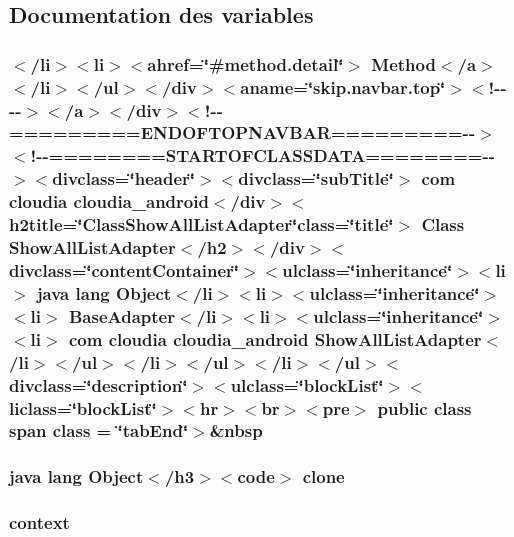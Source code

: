 \subsection{Documentation des variables}
\hypertarget{_show_all_list_adapter_8html_afe28951bafe2fbb9ad941f5c294b0a9b}{
\subsubsection[{class}]{\setlength{\rightskip}{0pt plus 5cm}$<$/li$>$$<$li$>$$<$ahref=\char`\"{}\#method.\-detail\char`\"{}$>$ Method$<$/{\bf a}$>$$<$/li$>$$<$/ul$>$$<$/div$>$$<$aname=\char`\"{}skip.\-navbar.\-top\char`\"{}$>$$<$!-\/-\/-\/-\/$>$$<$/a$>$$<$/div$>$$<$!-\/-\/=========E\-N\-D\-O\-F\-T\-O\-P\-N\-A\-V\-B\-A\-R=========-\/-\/$>$$<$!-\/-\/========S\-T\-A\-R\-T\-O\-F\-C\-L\-A\-S\-S\-D\-A\-T\-A========-\/-\/$>$$<$divclass=\char`\"{}header\char`\"{}$>$$<$divclass=\char`\"{}sub\-Title\char`\"{}$>$ com cloudia cloudia\-\_\-android$<$/div$>$$<$h2title=\char`\"{}Class\-Show\-All\-List\-Adapter\char`\"{}class=\char`\"{}title\char`\"{}$>$ Class {\bf Show\-All\-List\-Adapter}$<$/h2$>$$<$/div$>$$<$divclass=\char`\"{}content\-Container\char`\"{}$>$$<$ulclass=\char`\"{}inheritance\char`\"{}$>$$<$li$>$ java lang Object$<$/li$>$$<$li$>$$<$ulclass=\char`\"{}inheritance\char`\"{}$>$$<$li$>$ Base\-Adapter$<$/li$>$$<$li$>$$<$ulclass=\char`\"{}inheritance\char`\"{}$>$$<$li$>$ com cloudia cloudia\-\_\-android {\bf Show\-All\-List\-Adapter}$<$/li$>$$<$/ul$>$$<$/li$>$$<$/ul$>$$<$/li$>$$<$/ul$>$$<$divclass=\char`\"{}description\char`\"{}$>$$<$ulclass=\char`\"{}block\-List\char`\"{}$>$$<$liclass=\char`\"{}block\-List\char`\"{}$>$$<$hr$>$$<$br$>$$<$pre$>$ public class {\bf span} class = \char`\"{}tab\-End\char`\"{}$>$\&nbsp}}\label{_show_all_list_adapter_8html_afe28951bafe2fbb9ad941f5c294b0a9b}
\hypertarget{_show_all_list_adapter_8html_adc9607fcabf6f2d7f401ad52015ef6e0}{
\subsubsection[{clone}]{\setlength{\rightskip}{0pt plus 5cm}java lang Object$<$/h3$>$$<$code$>$ clone}}\label{_show_all_list_adapter_8html_adc9607fcabf6f2d7f401ad52015ef6e0}
\hypertarget{_show_all_list_adapter_8html_a261f9f58ccbeaa962c4e675e4212c9cc}{
\subsubsection[{context}]{\setlength{\rightskip}{0pt plus 5cm}context}}\label{_show_all_list_adapter_8html_a261f9f58ccbeaa962c4e675e4212c9cc}
